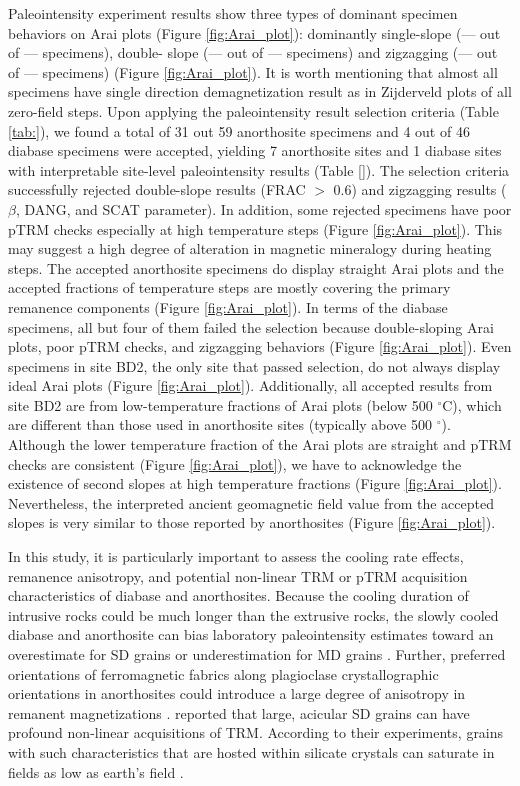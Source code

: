 \documentclass[draft]{agujournal2019}
\begin{document}
Paleointensity experiment results show three types of dominant specimen behaviors on Arai plots (Figure \ref{fig:Arai_plot}): dominantly single-slope (--- out of --- specimens), double- slope (--- out of --- specimens) and zigzagging (--- out of --- specimens) (Figure \ref{fig:Arai_plot}). It is worth mentioning that almost all specimens have single direction demagnetization result as in Zijderveld plots of all zero-field steps. Upon applying the paleointensity result selection criteria (Table \ref{tab:}), we found a total of 31 out 59 anorthosite specimens and 4 out of 46 diabase specimens were accepted, yielding 7 anorthosite sites and 1 diabase sites with interpretable site-level paleointensity results (Table \ref{}). The selection criteria successfully rejected double-slope results (FRAC $>$ 0.6) and zigzagging results ($\beta$, DANG, and SCAT parameter). In addition, some rejected specimens have poor pTRM checks especially at high temperature steps (Figure \ref{fig:Arai_plot}). This may suggest a high degree of alteration in magnetic mineralogy during heating steps. The accepted anorthosite specimens do display straight Arai plots and the accepted fractions of temperature steps are mostly covering the primary remanence components (Figure \ref{fig:Arai_plot}). In terms of the diabase specimens, all but four of them failed the selection because double-sloping Arai plots, poor pTRM checks, and zigzagging behaviors (Figure \ref{fig:Arai_plot}). Even specimens in site BD2, the only site that passed selection, do not always display ideal Arai plots (Figure \ref{fig:Arai_plot}). Additionally, all accepted results from site BD2 are from low-temperature fractions of Arai plots (below 500 $^\circ$C), which are different than those used in anorthosite sites (typically above 500 $^\circ$). Although the lower temperature fraction of the Arai plots are straight and pTRM checks are consistent (Figure \ref{fig:Arai_plot}), we have to acknowledge the existence of second slopes at high temperature fractions (Figure \ref{fig:Arai_plot}). Nevertheless, the interpreted ancient geomagnetic field value from the accepted slopes is very similar to those reported by anorthosites (Figure \ref{fig:Arai_plot}). 

In this study, it is particularly important to assess the cooling rate effects, remanence anisotropy, and potential non-linear TRM or pTRM acquisition characteristics of diabase and anorthosites. Because the cooling duration of intrusive rocks could be much longer than the extrusive rocks, the slowly cooled diabase and anorthosite can bias laboratory paleointensity estimates toward an overestimate for SD grains \cite{Dodson1980a, Halgedahl1980a, Selkin2000a} or underestimation for MD grains \cite{McClelland-Brown1984a}. Further, preferred orientations of ferromagnetic fabrics along plagioclase crystallographic orientations in anorthosites could introduce a large degree of anisotropy in remanent magnetizations \cite{Selkin2007a, Biedermann2018a}.  reported that large, acicular SD grains can have profound non-linear acquisitions of TRM. According to their experiments, grains with such characteristics that are hosted within silicate crystals can saturate in fields as low as earth's field \cite{Selkin2007a}. 
\end{document}
